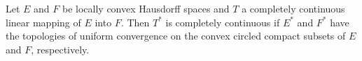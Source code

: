 Let $E$ and $F$ be locally convex Hausdorff spaces and $T$ a completely continuous linear mapping of $E$ into $F$. Then $T^{*}$ is completely continuous if $E^{*}$ and $F^{*}$ have the topologies of uniform convergence on the convex circled compact subsets of $E$ and $F$, respectively.
